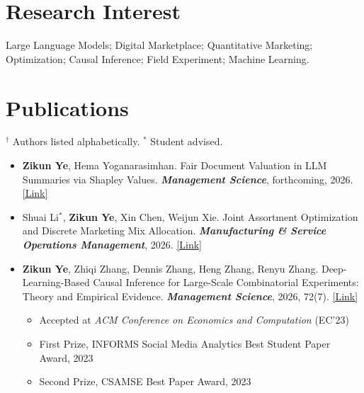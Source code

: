 \documentclass[margin,line]{resume}
\begin{document}
\begin{resume}
   

\section{\mysidestyle Research Interest}
   Large Language Models; Digital Marketplace; Quantitative Marketing; Optimization; Causal Inference; Field Experiment; Machine Learning.

    
    
    
    

\section{\mysidestyle Publications}
$^{\dagger}$ Authors listed alphabetically. $^{*}$ Student advised.\\

     \begin{itemize}[topsep=-5mm, leftmargin=0mm]

     \item[] \textbf{Zikun Ye}, Hema Yoganarasimhan. Fair Document Valuation in LLM Summaries via Shapley Values. \textit{\textbf{Management Science}}, forthcoming, 2026. \href{https://arxiv.org/abs/2505.23842}{[Link]}

\vspace{\medskipamount}

     \item[] Shuai Li$^{*}$, \textbf{Zikun Ye}, Xin Chen, Weijun Xie. Joint Assortment Optimization and Discrete Marketing Mix Allocation. \textit{\textbf{Manufacturing \& Service Operations Management}}, 2026. \href{https://pubsonline.informs.org/doi/abs/10.1287/msom.2024.1406}{[Link]}

\vspace{\medskipamount}

     \item[] \textbf{Zikun Ye}, Zhiqi Zhang, Dennis Zhang, Heng Zhang, Renyu Zhang. Deep-Learning-Based Causal Inference for Large-Scale Combinatorial Experiments: Theory and Empirical Evidence. \textit{\textbf{Management Science}}, 2026, 72(7). \href{https://pubsonline.informs.org/doi/10.1287/mnsc.2024.04625}{[Link]}
    \begin{itemize}
       \item [-] Accepted at \textit{ACM Conference on Economics and Computation} (EC'23)
         \item [-] First Prize, INFORMS Social Media Analytics Best Student Paper Award, 2023
        \item [-] Second Prize, CSAMSE Best Paper Award, 2023
     \end{itemize}


\end{itemize}
\end{resume}
\end{document}
